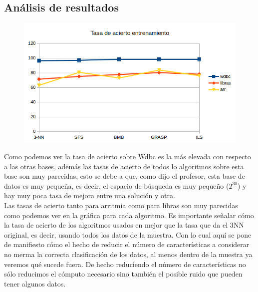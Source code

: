 \documentclass[10pt,a4paper]{article}
\begin{document}
\subsection{\color[rgb]{0.0,0.0,0.51}Análisis de resultados}


\begin{figure}[H]
\centering
\includegraphics[width=130mm]{tasa_train.png}
\end{figure}

Como podemos ver la tasa de acierto sobre Wdbc es la más elevada con respecto a las otras bases, además las tasas de acierto de todos lo algoritmos sobre esta base son muy parecidas, esto se debe a que, como dijo el profesor, esta base de datos es muy pequeña, es decir, el espacio de búsqueda es muy pequeño ($2^{30}$) y hay muy poca tasa de mejora entre una solución y otra.\\

Las tasas de acierto tanto para arritmia como para libras son muy parecidas como podemos ver en la gráfica para cada algoritmo. Es importante señalar cómo la tasa de acierto de los algoritmos usados en mejor que la tasa que da el 3NN original, es decir, usando todos los datos de la muestra. Con lo cual aquí se pone de manifiesto cómo el hecho de reducir el número de características a considerar no merma la correcta clasificación de los datos, al menos dentro de la muestra ya veremos qué sucede fuera. De hecho reduciendo el número de características no sólo reducimos el cómputo necesario sino también el posible ruido que pueden tener algunos datos.\\
\end{document}
